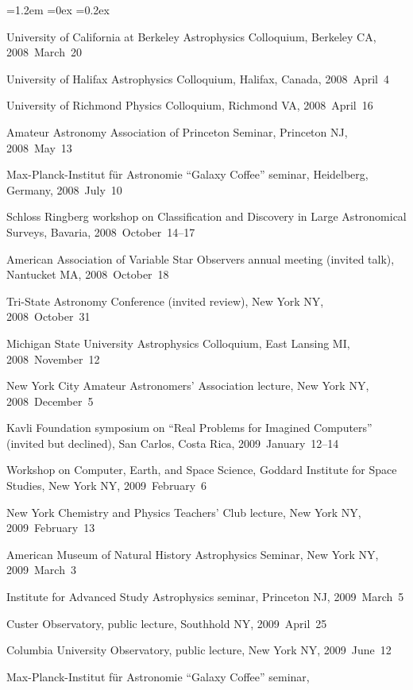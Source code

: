 \documentclass[10pt,letterpaper]{article}
\newcounter{refpubnum}
\newcommand{\hogglist}{%
    \rightmargin=0in
    \leftmargin=1.2em
    \topsep=0ex
    \partopsep=0pt
    \itemsep=0.2ex
    \parsep=0pt
    \itemindent=-1.0\leftmargin
    \listparindent=0.0\leftmargin
    \settowidth{\labelsep}{~}
    \usecounter{refpubnum}
  }
\begin{document}
\begin{list}{}{\hogglist}
{\item University of California at Berkeley Astrophysics Colloquium,
          Berkeley CA, 2008~March~20
\item University of Halifax Astrophysics Colloquium,
          Halifax, Canada, 2008~April~4
\item University of Richmond Physics Colloquium,
          Richmond VA, 2008~April~16
\item Amateur Astronomy Association of Princeton Seminar,
          Princeton NJ, 2008~May~13
\item Max-Planck-Institut f\"ur Astronomie ``Galaxy Coffee'' seminar,
          Heidelberg, Germany,
          2008~July~10
\item Schloss Ringberg workshop on Classification and Discovery
          in Large Astronomical Surveys, Bavaria,
          2008~October~14--17
\item American Association of Variable Star Observers annual meeting
          (invited talk), Nantucket MA, 2008~October~18
\item Tri-State Astronomy Conference (invited review),
          New York NY, 2008~October~31
\item Michigan State University Astrophysics Colloquium,
          East Lansing MI, 2008~November~12
\item New York City Amateur Astronomers' Association lecture,
          New York NY, 2008~December~5
\item Kavli Foundation symposium on ``Real Problems for Imagined Computers''
          (invited but declined), San Carlos, Costa Rica, 2009~January~12--14
\item Workshop on Computer, Earth, and Space Science,
          Goddard Institute for Space Studies, New York NY, 2009~February~6
\item New York Chemistry and Physics Teachers' Club lecture,
          New York NY, 2009~February~13
\item American Museum of Natural History Astrophysics Seminar,
          New York NY, 2009~March~3
\item Institute for Advanced Study Astrophysics seminar,
          Princeton NJ, 2009~March~5
\item Custer Observatory, public lecture,
          Southhold NY, 2009~April~25
\item Columbia University Observatory, public lecture,
          New York NY, 2009~June~12
\item Max-Planck-Institut f\"ur Astronomie ``Galaxy Coffee'' seminar,
}
\end{list}
\end{document}
